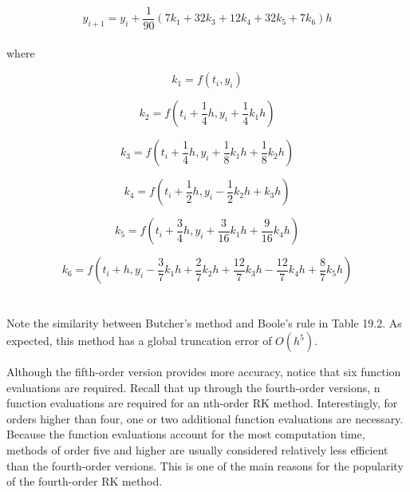 \documentclass[../main.tex]{subfiles}
\begin{document}
\begin{equation}
\tag{22.45}
y_{i+1} = y_i + \dfrac{1}{90}(7k_1 + 32k_3 + 12k_4 + 32k_5 + 7k_6)h
\end{equation}\\
where

\begin{equation}
\tag{22.45a}
k_1 = f(t_i,y_i)
\end{equation}

\begin{equation}
\tag{22.45b}
k_2 = f \left( t_i + \dfrac{1}{4}h, y_i + \dfrac{1}{4}k_1h \right)
\end{equation}

\begin{equation}
\tag{22.45c}
k_3 = f \left(t_i + \dfrac{1}{4}h, y_i + \dfrac{1}{8}k_1h+\dfrac{1}{8}k_2h \right)
\end{equation}

\begin{equation}
\tag{22.45d}
k_4 = f \left(t_i + \dfrac{1}{2}h, y_i - \dfrac{1}{2} k_2h + k_3h \right)
\end{equation}

\begin{equation}
\tag{22.45e}
k_5 = f \left(t_i + \dfrac{3}{4}h, y_i + \dfrac{3}{16}k_1h + \dfrac{9}{16}k_4h \right)
\end{equation}

\begin{equation}
\tag{22.45f}
k_6 = f \left( t_i + h, y_i - \dfrac{3}{7}k_1h + \dfrac{2}{7}k_2h + \dfrac{12}{7}k_3h - \dfrac{12}{7} k_4h + \dfrac{8}{7}k_5h \right)
\end{equation}\\
\\
Note the similarity between Butcher's method and Boole's rule in Table 19.2. As expected,
this method has a global truncation error of $O(h^5)$.

Although the fifth-order version provides more accuracy, notice that six function evaluations are required. Recall that up through the fourth-order versions, n function evaluations are required for an nth-order RK method. Interestingly, for orders higher than four, one or
two additional function evaluations are necessary. Because the function evaluations account
for the most computation time, methods of order five and higher are usually considered relatively less efficient than the fourth-order versions. This is one of the main reasons for the
popularity of the fourth-order RK method.
\end{document}
